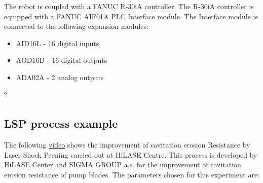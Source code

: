The robot is coupled with a FANUC R-30iA controller. The R-30iA controller is equipped with a FANUC AIF01A PLC Interface module. The Interface module is connected to the following expansion modules:

\begin{itemize}
    \item AID16L - 16 digital inputs
    \item AOD16D - 16 digital outputs
    \item ADA02A - 2 analog outputs
\end{itemize}

\textsuperscript{2}

\subsection{LSP process example}

The following \href{https://www.youtube.com/watch?v=awhlLU91-dk&ab_channel=HiLASECentre}{video} shows the improvement of cavitation erosion Resistance by Laser Shock Peening carried out at HiLASE Centre. This process is developed by HiLASE Center and SIGMA GROUP a.s. for the improvement of cavitation erosion resistance of pump blades. The parameters chosen for this experiment are:

